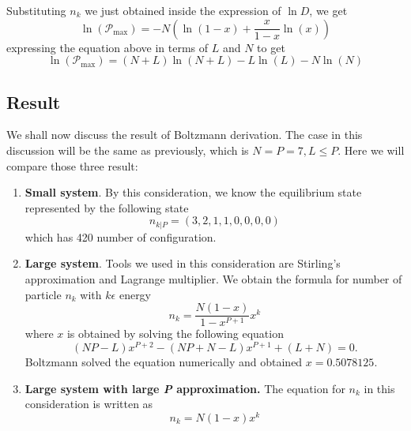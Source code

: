 \documentclass[../../../Main.tex]{subfiles}
\begin{document}
Substituting $n_k$ we just obtained inside the expression of $\ln D$, we get 
\begin{equation*}
    \ln(\mathcal{P}_\text{max})=-N\left(\ln (1-x)+\frac{x}{1-x}\ln (x)\right)
\end{equation*}
expressing the equation above in terms of $L$ and $N$ to get 
\begin{equation*}
    \ln(\mathcal{P}_\text{max})= (N+L)\ln (N+L) - L\ln (L)-N\ln (N)
\end{equation*}

\subsection*{Result}
We shall now discuss the result of Boltzmann derivation. The case in this discussion will be the same as previously, which is $N = P = 7 , L \leq P$. Here we will compare those three result: 
\begin{enumerate}
    \item \textbf{Small system}. By this consideration, we know the equilibrium state represented by the following state \begin{equation*}
        n_{k|P}=(3, 2, 1, 1, 0, 0, 0, 0)
    \end{equation*} which has 420 number of configuration.
    \item \textbf{Large system}. Tools we used in this consideration are Stirling's approximation and Lagrange multiplier. We obtain the formula for number of particle $n_k$ with $k\epsilon$ energy \begin{equation*}
        n_k=\frac{N(1-x)}{1-x^{P+1}}x^k
    \end{equation*}
    where $x$ is obtained by solving the following equation
    \begin{equation*}
        (N P - L)x^{P+2} - (NP + N - L)x^{P+1} + (L + N ) = 0.
    \end{equation*}
    Boltzmann solved the equation numerically and obtained $x=0.5078125$.
    \item \textbf{Large system with large \emph{P} approximation.} The equation for $n_k$ in this consideration is written as \begin{equation*}
        n_k= N (1 - x)x^k 
    \end{equation*}
\end{enumerate}
\end{document}

